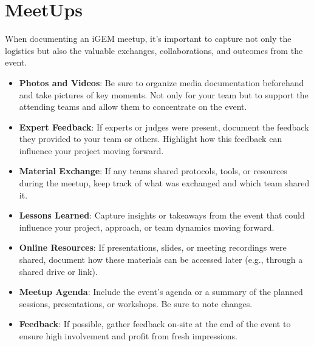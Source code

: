 \section{MeetUps} \label{sec:meetups} 
When documenting an iGEM meetup, it's important to capture not only the logistics but also the valuable exchanges, collaborations, and outcomes from the event.
\begin{itemize}
    \item \textbf{Photos and Videos}: Be sure to organize media documentation beforehand and take pictures of key moments.
    Not only for your team but to support the attending teams and allow them to concentrate on the event.
    \item \textbf{Expert Feedback}: If experts or judges were present, document the feedback they provided to your team or others.
    Highlight how this feedback can influence your project moving forward.
    \item \textbf{Material Exchange}: If any teams shared protocols, tools, or resources during the meetup, keep track of what was exchanged and which team shared it.
    \item \textbf{Lessons Learned}: Capture insights or takeaways from the event that could influence your project, approach, or team dynamics moving forward.
    \item \textbf{Online Resources}: If presentations, slides, or meeting recordings were shared, document how these materials can be accessed later (e.g., through a shared drive or link).
    \item \textbf{Meetup Agenda}: Include the event’s agenda or a summary of the planned sessions, presentations, or workshops.
    Be sure to note changes.
    \item \textbf{Feedback}: If possible, gather feedback on-site at the end of the event to ensure high involvement and profit from fresh impressions.
\end{itemize}
